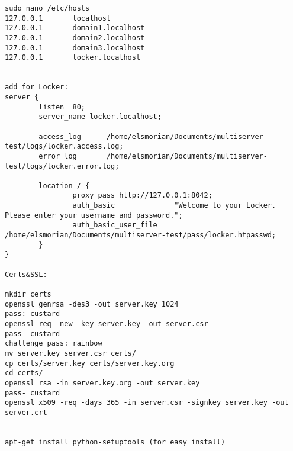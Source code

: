 \documentclass[A4paper,11pt]{article}
\begin{document}
\begin{lstlisting}
sudo nano /etc/hosts
127.0.0.1       localhost
127.0.0.1       domain1.localhost
127.0.0.1       domain2.localhost
127.0.0.1       domain3.localhost
127.0.0.1       locker.localhost


add for Locker:
server {
        listen  80;
        server_name locker.localhost;

        access_log      /home/elsmorian/Documents/multiserver-test/logs/locker.access.log;
        error_log       /home/elsmorian/Documents/multiserver-test/logs/locker.error.log;

        location / {
                proxy_pass http://127.0.0.1:8042;
                auth_basic              "Welcome to your Locker. Please enter your username and password.";
                auth_basic_user_file    /home/elsmorian/Documents/multiserver-test/pass/locker.htpasswd;
        }
}

Certs&SSL:

mkdir certs
openssl genrsa -des3 -out server.key 1024
pass: custard
openssl req -new -key server.key -out server.csr
pass- custard
challenge pass: rainbow
mv server.key server.csr certs/
cp certs/server.key certs/server.key.org
cd certs/
openssl rsa -in server.key.org -out server.key
pass- custard
openssl x509 -req -days 365 -in server.csr -signkey server.key -out server.crt


apt-get install python-setuptools (for easy_install)

\end{lstlisting}
\end{document}
